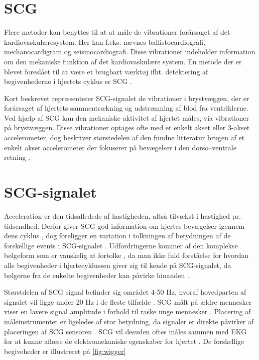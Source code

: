 \section{SCG}
Flere metoder kan benyttes til at at måle de vibrationer forårsaget af det kardiovaskulæresystem. Her kan f.eks. nævnes ballistocardiografi, mechanocardigram og seismocardiografi. Disse vibrationer indeholder information om den mekaniske funktion af det kardiovaskulære system. En metode der er blevet foreslået til at være et brugbart værktøj ifht. detektering af begivenhederne i hjertets cyklus er SCG \cite{phd}. 

Kort beskrevet repræsenterer SCG-signalet de vibrationer i brystvæggen, der er forårsaget af hjertets sammentrækning og udstrømning af blod fra ventriklerne. Ved hjælp af  SCG kan den mekaniske aktivitet af hjertet måles, via vibrationer på brystvæggen. Disse vibrationer optages ofte med et enkelt akset eller 3-akset accelerometer, dog beskriver størstedelen af den fundne litteratur  brugen af et enkelt akset accelerometer der fokuserer på bevægelser i den dorso–ventrale retning \cite{Recent_Advances}.

\section{SCG-signalet}
Acceleration er den tidsafledede af hastigheden, altså tilvækst i hastighed pr. tidsendhed. Derfor giver SCG god information om hjertes bevægelser igennem dens cyklus \cite{performance}, dog  foreligger en variation i tolkningen af betydningen af de forskellige events i SCG-signalet \cite{phd}. Udfordringerne kommer af den komplekse bølgeform som er vanskelig at fortolke \cite{zanetti}, da man ikke fuld forståelse for hvordan alle begivenheder i hjertecyklussen giver sig til kende på SCG-signalet, da bølgerne fra de enkelte begivenheder kan påvirke hinanden \cite{abra}.

Størstdelen af SCG signal befinder sig området 4-50 Hz, hvoraf hovedparten af signalet vil ligge under 20 Hz i de fleste tilfælde \cite{phd}. 
 SCG målt på ældre mennesker viser en lavere signal amplitude i forhold til raske unge mennesker \cite{Recent_Advances}. Placering af måleinstrumentet er ligeledes af stor betydning, da signaler er direkte påvirker af placeringen af SCG sensoren \cite{zanetti}. SCG vil desuden oftes måles sammen med EKG for at kunne aflæse de elektromekaniske egenskaber for hjertet \cite{abra}. De forskellige begiveheder er illustreret på  \ref{fig:wigger}



